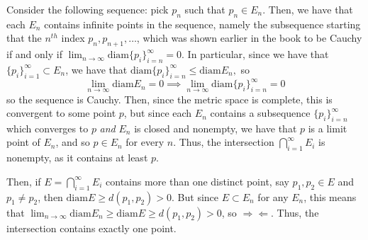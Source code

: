 \documentclass[12pt,letterpaper]{article}
\theoremstyle{definition}
\newcommand{\contra}{\Rightarrow\!\Leftarrow}
\begin{document}
Consider the following sequence: pick $p_{n}$ such that $p_{n} \in E_{n}$. Then, we have that each $E_{n}$ contains infinite points in the sequence, namely the subsequence starting that the $n^{th}$ index $p_{n}, p_{n+1}, \dots$, which was shown earlier in the book to be Cauchy if and only if $\lim_{n \rightarrow \infty}\text{diam}\{p_{i}\}_{i=n}^{\infty} = 0$. In particular, since we have that $\{p_{i}\}_{i=1}^{\infty} \subset E_{n}$, we have that $\text{diam}\{p_{i}\}_{i=n}^{\infty} \leq \text{diam}E_{n},$ so
\[
  \lim_{n \rightarrow \infty}\text{diam}E_{n} = 0 \implies \lim_{n \rightarrow \infty}\text{diam}\{p_{i}\}_{i=n}^{\infty} = 0
\]
so the sequence is Cauchy. Then, since the metric space is complete, this is convergent to some point $p$, but since each $E_{n}$ contains a subsequence $\{p_{i}\}_{i=n}^{\infty}$ which converges to $p$ \textit{and} $E_{n}$ is closed and nonempty, we have that $p$ is a limit point of $E_{n}$, and so $p \in E_{n}$ for every $n$. Thus, the intersection $\bigcap_{i=1}^{\infty}E_{i}$ is nonempty, as it contains at least $p$.

Then, if $E = \bigcap_{i=1}^{\infty} E_{i}$ contains more than one distinct point, say $p_{1}, p_{2} \in E$ and $p_{1} \neq p_{2}$, then $\text{diam}E \geq d(p_{1}, p_{2}) > 0$. But since $E \subset E_{n}$ for any $E_{n}$, this means that $\lim_{n \rightarrow \infty}\text{diam} E_{n} \geq \text{diam} E \geq d(p_{1}, p_{2}) > 0$, so $\contra$. Thus, the intersection contains exactly one point.
\end{document}
